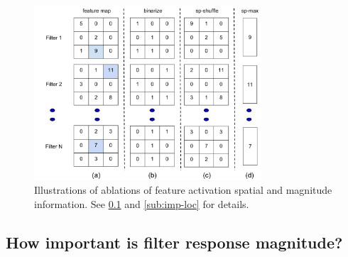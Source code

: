 \begin{figure}[t!]
\centering
\includegraphics[height=6.5cm]{images/ablation.pdf}
\caption{Illustrations of ablations of feature activation spatial and magnitude information.
See \ref{sub:imp-mag} and \ref{sub:imp-loc} for details.}
\label{fig:features}
\end{figure}

\subsection{How important is filter response magnitude?}
\label{sub:imp-mag}
\setlength{\tabcolsep}{4pt}
\begin{table}[t!]
\begin{center}
\caption{Percentage non-zeros (sparsity) in filter responses of CNN.}
\label{table:sparse}
\vspace{0.3em}
\end{center}
\end{table}
\setlength{\tabcolsep}{1.4pt}

